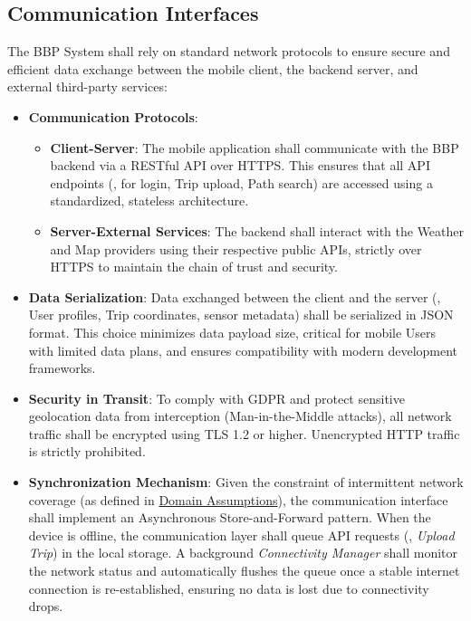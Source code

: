 \subsection{Communication Interfaces}
The BBP System shall rely on standard network protocols to ensure secure and efficient data exchange between the mobile client, the backend server, and external third-party services:
\begin{itemize}
    \item \textbf{Communication Protocols}:
    \begin{itemize}
        \item \textbf{Client-Server}: The mobile application shall communicate with the BBP backend via a RESTful API over HTTPS. This ensures that all API endpoints (\eg, for login, Trip upload, Path search) are accessed using a standardized, stateless architecture.
        \item \textbf{Server-External Services}: The backend shall interact with the Weather and Map providers using their respective public APIs, strictly over HTTPS to maintain the chain of trust and security.
    \end{itemize}

    \item \textbf{Data Serialization}:
        Data exchanged between the client and the server (\eg, User profiles, Trip coordinates, sensor metadata) shall be serialized in JSON format. This choice minimizes data payload size, critical for mobile Users with limited data plans, and ensures compatibility with modern development frameworks.

    \item \textbf{Security in Transit}:
    To comply with GDPR and protect sensitive geolocation data from interception (Man-in-the-Middle attacks), all network traffic shall be encrypted using TLS 1.2 or higher. Unencrypted HTTP traffic is strictly prohibited.

    \item \textbf{Synchronization Mechanism}:
    Given the constraint of intermittent network coverage (as defined in \hyperref[domain_assumptions]{Domain Assumptions}), the communication interface shall implement an Asynchronous Store-and-Forward pattern. When the device is offline, the communication layer shall queue API requests (\eg, \emph{Upload Trip}) in the local storage. A background \emph{Connectivity Manager} shall monitor the network status and automatically flushes the queue once a stable internet connection is re-established, ensuring no data is lost due to connectivity drops.
\end{itemize}

